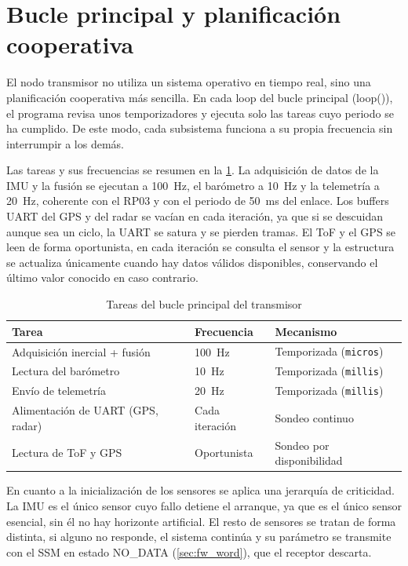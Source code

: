 \section{Bucle principal y planificación cooperativa}
\label{sec:fw_loop}

El nodo transmisor no utiliza un sistema operativo en tiempo real, sino una planificación cooperativa más sencilla. En cada loop del bucle principal (loop()), el programa revisa unos temporizadores y ejecuta solo las tareas cuyo periodo se ha cumplido. De este modo, cada subsistema funciona a su propia frecuencia sin interrumpir a los demás.

Las tareas y sus frecuencias se resumen en la \cref{tab:fw_rates}. La
adquisición de datos de la IMU y la fusión se ejecutan a \SI{100}{\hertz}, el barómetro a
\SI{10}{\hertz} y la telemetría a \SI{20}{\hertz}, coherente con el RP03 y con
el periodo de \SI{50}{\milli\second} del enlace. Los buffers UART del GPS y del
radar se vacían en cada iteración, ya que si se descuidan aunque sea un ciclo, la
UART se satura y se pierden tramas. El ToF y el GPS se leen de forma oportunista, en cada iteración se consulta el sensor y la estructura se actualiza únicamente cuando hay datos válidos disponibles, conservando el último valor conocido en caso contrario.

\begin{table}[H]
    \centering
    \caption{Tareas del bucle principal del transmisor}
    \label{tab:fw_rates}
    \begin{tabularx}{\linewidth}{X l l}
        \toprule
        \textbf{Tarea} & \textbf{Frecuencia} & \textbf{Mecanismo} \\
        \midrule
        Adquisición inercial + fusión & \SI{100}{\hertz} & Temporizada (\texttt{micros}) \\
        Lectura del barómetro         & \SI{10}{\hertz}  & Temporizada (\texttt{millis}) \\
        Envío de telemetría           & \SI{20}{\hertz}  & Temporizada (\texttt{millis}) \\
        Alimentación de UART (GPS, radar) & Cada iteración & Sondeo continuo \\
        Lectura de ToF y GPS          & Oportunista       & Sondeo por disponibilidad \\
        \bottomrule
    \end{tabularx}
\end{table}



En cuanto a la inicialización de los sensores se aplica una jerarquía de criticidad. La IMU es el único
sensor cuyo fallo detiene el arranque, ya que es el único sensor esencial, sin él no hay horizonte artificial. El resto de sensores se tratan de forma distinta, si alguno no responde, el sistema continúa y su parámetro se transmite con el SSM en estado
NO\_DATA (\cref{sec:fw_word}), que el receptor descarta.


